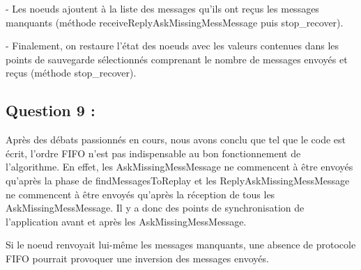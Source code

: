 \documentclass[11pt,a4paper]{report}
\begin{document}
- Les noeuds ajoutent à la liste des messages qu'ils ont reçus les messages manquants (méthode receiveReplyAskMissingMessMessage puis stop_recover).

- Finalement, on restaure l'état des noeuds avec les valeurs contenues dans les points de sauvegarde sélectionnés comprenant le nombre de messages envoyés et reçus (méthode stop_recover).


\section{Question 9 :}

Après des débats passionnés en cours, nous avons conclu que tel que le code est écrit, l'ordre FIFO n'est pas indispensable au bon fonctionnement de l'algorithme. En effet, les AskMissingMessMessage ne commencent à être envoyés qu'après la phase de findMessagesToReplay et les ReplyAskMissingMessMessage ne commencent à être envoyés qu'après la réception de tous les AskMissingMessMessage. Il y a donc des points de synchronisation de l'application avant et après les AskMissingMessMessage.

Si le noeud renvoyait lui-même les messages manquants, une absence de protocole FIFO pourrait provoquer une inversion des messages envoyés.
\chapter{}
\end{document}
